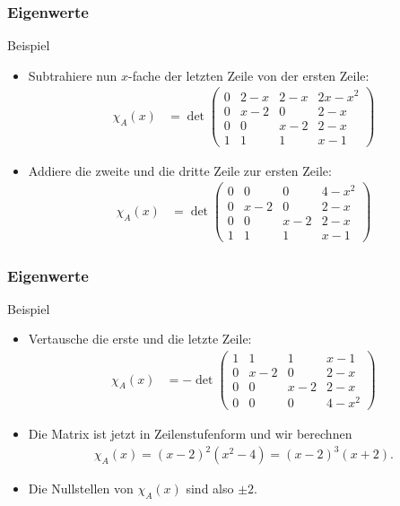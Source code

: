 \documentclass{beamer}
\newcommand{\mytitle}{Eigenwerte}
\begin{document}
\begin{frame}\frametitle{\mytitle}
	\begin{block}{Beispiel}
	\begin{itemize}
		\item Subtrahiere nun $x$-fache der letzten Zeile von der ersten Zeile:
\begin{align*}
				\chi_A(x)&=\det\begin{pmatrix}
					0&2-x&2-x&2x-x^2\\0&x-2&0&2-x\\0&0&x-2&2-x\\1&1&1&x-1
				\end{pmatrix}
			\end{align*}
		\item Addiere die zweite und die dritte Zeile zur ersten Zeile:
\begin{align*}
				\chi_A(x)&=\det\begin{pmatrix}
					0&0&0&4-x^2\\0&x-2&0&2-x\\0&0&x-2&2-x\\1&1&1&x-1
				\end{pmatrix}
			\end{align*}
	\end{itemize}
	\end{block}
\end{frame}

\begin{frame}\frametitle{\mytitle}
	\begin{block}{Beispiel}
	\begin{itemize}
		\item Vertausche die erste und die letzte Zeile:
\begin{align*}
				\chi_A(x)&=-\det\begin{pmatrix}
					1&1&1&x-1 \\0&x-2&0&2-x\\0&0&x-2&2-x\\0&0&0&4-x^2				\end{pmatrix}
			\end{align*}
		\item Die Matrix ist jetzt in Zeilenstufenform und wir berechnen
			\begin{align*}
				\chi_A(x)=(x-2)^2(x^2-4)=(x-2)^3(x+2).
			\end{align*}
		\item Die Nullstellen von $\chi_A(x)$ sind also $\pm2$.
	\end{itemize}
	\end{block}
\end{frame}
\end{document}
